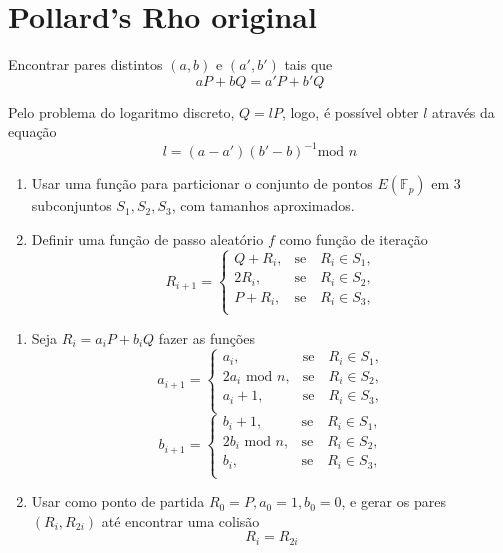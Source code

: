 \documentclass{beamer}
\newcounter{saveenumi}
\newcommand{\seti}{\setcounter{saveenumi}{\value{enumi}}}
\newcommand{\conti}{\setcounter{enumi}{\value{saveenumi}}}
\begin{document}
%
%

\section{Pollard's Rho original}
\begin{frame}
Encontrar pares distintos $(a,b)$ e $(a',b')$ tais que
$$aP + bQ = a'P + b'Q$$

Pelo problema do logaritmo discreto, $Q = lP$, logo, é possível obter $l$ através da equação
$$l = (a - a')(b' - b)^{-1} \mbox{mod }n$$
\end{frame}
\begin{frame}
  \begin{enumerate}
    \item Usar uma função para particionar o conjunto de pontos $E(\mathbb{F}_p)$ em 3 subconjuntos $S_1, S_2, S_3$, com tamanhos aproximados.
    \item Definir uma função de passo aleatório $f$ como função de iteração
    $$
      R_{i+1}=\left\{\begin{array}{rc}
      Q + R_i,&\mbox{se}\quad R_i \in S_1,\\
      2R_i,&\mbox{se}\quad R_i \in S_2,\\
      P + R_i,&\mbox{se}\quad R_i \in S_3,\\
      \end{array}\right.
    $$ 
    \seti
  \end{enumerate}
\end{frame}
\begin{frame}
  \begin{enumerate}
    \conti
    \item Seja $R_i = a_iP + b_iQ$ fazer as funções
      $$
        a_{i+1}=\left\{\begin{array}{rc}
        a_i,&\mbox{se}\quad R_i \in S_1,\\
        2a_i \mbox{ mod }n,&\mbox{se}\quad R_i \in S_2,\\
        a_i + 1,&\mbox{se}\quad R_i \in S_3,\\
        \end{array}\right.
      $$
      $$
        b_{i+1}=\left\{\begin{array}{rc}
        b_i + 1,&\mbox{se}\quad R_i \in S_1,\\
        2b_i \mbox{ mod }n,&\mbox{se}\quad R_i \in S_2,\\
        b_i,&\mbox{se}\quad R_i \in S_3,\\
        \end{array}\right.
      $$
    \item Usar como ponto de partida $R_0 = P, a_0 = 1, b_0 = 0$, e gerar os pares $(R_i, R_{2i})$ até encontrar uma colisão
      $$ R_i = R_{2i} $$
    \conti
  \end{enumerate}
\end{frame}
\end{document}
